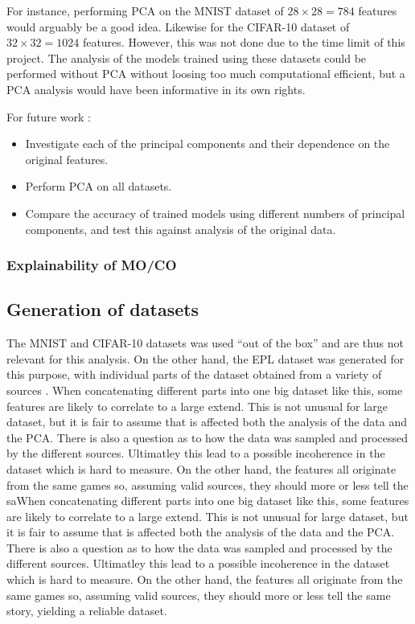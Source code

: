     For instance, performing PCA on the MNIST dataset of $28\times 28 = 784$ features would arguably be a good idea. Likewise for the CIFAR-10 dataset of $32\times 32 = 1024$ features. However, this was not done due to the time limit of this project. The analysis of the models trained using these datasets could be performed without PCA without loosing too much  computational efficient, but a PCA analysis would have been  informative in its own rights. 
    
    For future work :
    \begin{itemize}
        \item Investigate each of the principal components and their dependence on the original features. 
        \item Perform PCA on all datasets. 
        \item Compare the accuracy of trained models using different numbers of principal components, and test this against analysis of the original data. 
    \end{itemize}


    

\subsubsection{Explainability of MO/CO}



\subsection{Generation of datasets}
	The MNIST and CIFAR-10 datasets was used ``out of the box'' and are thus not relevant for this analysis. On the other hand, the EPL dataset was generated for this purpose, with individual parts of the dataset obtained from a variety of sources . When concatenating different parts into one big dataset like this, some features are likely to correlate to a large extend. This is not unusual for large dataset, but it is fair to assume that is affected both the analysis of the data and the PCA. There is also a question as to how the data was sampled and processed by the different sources. Ultimatley this lead to a possible incoherence in the dataset which is hard to measure. On the other hand, the features all originate from the same games so, assuming valid sources, they should more or less tell the saWhen concatenating different parts into one big dataset like this, some features are likely to correlate to a large extend. This is not unusual for large dataset, but it is fair to assume that is affected both the analysis of the data and the PCA. There is also a question as to how the data was sampled and processed by the different sources. Ultimatley this lead to a possible incoherence in the dataset which is hard to measure. On the other hand, the features all originate from the same games so, assuming valid sources, they should more or less tell the same story, yielding a reliable dataset.  
